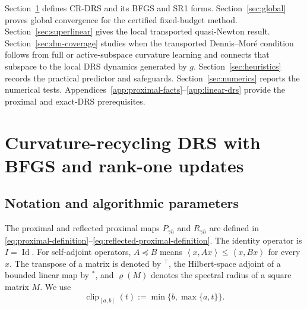 \documentclass[10pt,leqno]{amsart}
\numberwithin{equation}{section}
\numberwithin{algorithm}{section}
\theoremstyle{remark}
\newcommand{\Id}{\operatorname{Id}}
\newcommand{\ip}[2]{\left\langle #1,#2 \right\rangle}
\begin{document}
Section~\ref{sec:method} defines CR-DRS and its BFGS and SR1 forms.  Section~\ref{sec:global} proves global convergence for the certified fixed-budget method.  Section~\ref{sec:superlinear} gives the local transported quasi-Newton result.  Section~\ref{sec:dm-coverage} studies when the transported Dennis--Mor\'e condition follows from full or active-subspace curvature learning and connects that subspace to the local DRS dynamics generated by $g$.  Section~\ref{sec:heuristics} records the practical predictor and safeguards.  Section~\ref{sec:numerics} reports the numerical tests.  Appendices~\ref{app:proximal-facts}--\ref{app:linear-drs} provide the proximal and exact-DRS prerequisites.

\section{Curvature-recycling DRS with BFGS and rank-one updates}
\label{sec:method}

\subsection{Notation and algorithmic parameters}
\label{sec:notation-parameters}

The proximal and reflected proximal maps $P_{\gamma h}$ and $R_{\gamma h}$ are defined in \eqref{eq:proximal-definition}--\eqref{eq:reflected-proximal-definition}.  The identity operator is $I=\Id$.  For self-adjoint operators, $A\preceq B$ means $\ip{x}{Ax}\le \ip{x}{Bx}$ for every $x$.  The transpose of a matrix is denoted by ${}^{\top}$, the Hilbert-space adjoint of a bounded linear map by ${}^{*}$, and $\varrho(M)$ denotes the spectral radius of a square matrix $M$.  We use
\[
  \operatorname{clip}_{[a,b]}(t):=\min\{b,\max\{a,t\}\}.
\]
\end{document}
